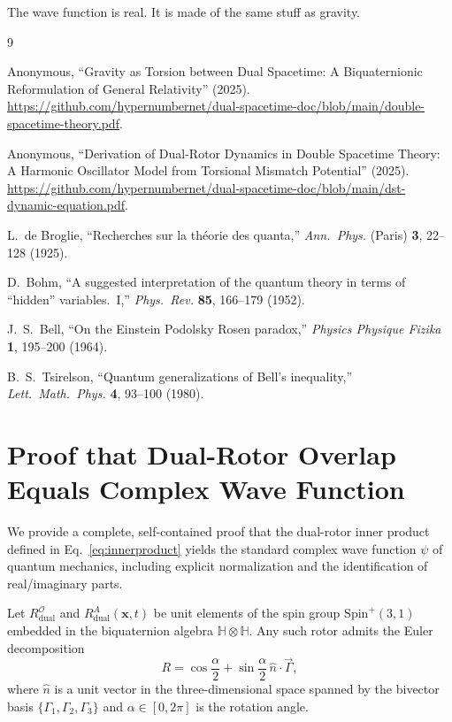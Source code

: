 \documentclass[dvipdfmx,a4paper]{article}
\begin{document}
The wave function is real. It is made of the same stuff as gravity.

\begin{thebibliography}{9}

Anonymous,
``Gravity as Torsion between Dual Spacetime: A Biquaternionic Reformulation of General Relativity'' (2025).
\url{https://github.com/hypernumbernet/dual-spacetime-doc/blob/main/double-spacetime-theory.pdf}.

Anonymous,
``Derivation of Dual-Rotor Dynamics in Double Spacetime Theory: A Harmonic Oscillator Model from Torsional Mismatch Potential'' (2025).
\url{https://github.com/hypernumbernet/dual-spacetime-doc/blob/main/dst-dynamic-equation.pdf}.

L.~de Broglie,
``Recherches sur la th\'eorie des quanta,''
\textit{Ann.\ Phys.} (Paris) \textbf{3}, 22--128 (1925).

D.~Bohm,
``A suggested interpretation of the quantum theory in terms of ``hidden'' variables.\ I,''
\textit{Phys.\ Rev.} \textbf{85}, 166--179 (1952).

J.~S.~Bell,
``On the Einstein Podolsky Rosen paradox,''
\textit{Physics Physique Fizika} \textbf{1}, 195--200 (1964).

B.~S.~Tsirelson,
``Quantum generalizations of Bell's inequality,''
\textit{Lett.\ Math.\ Phys.} \textbf{4}, 93--100 (1980).

\end{thebibliography}

\appendix
\section{Proof that Dual-Rotor Overlap Equals Complex Wave Function}

We provide a complete, self-contained proof that the dual-rotor inner product defined in Eq.~\eqref{eq:innerproduct} yields the standard complex wave function \(\psi\) of quantum mechanics, including explicit normalization and the identification of real/imaginary parts.

Let \( R_{\text{dual}}^{\mathcal{O}} \) and \( R_{\text{dual}}^{A}(\mathbf{x},t) \) be unit elements of the spin group \(\mathrm{Spin}^+(3,1)\) embedded in the biquaternion algebra \(\mathbb{H}\otimes\mathbb{H}\). Any such rotor admits the Euler decomposition
\[
R = \cos\frac{\alpha}{2} + \sin\frac{\alpha}{2}\, \hat{n}\cdot\vec{\Gamma},
\]
where \(\hat{n}\) is a unit vector in the three-dimensional space spanned by the bivector basis \(\{\Gamma_1,\Gamma_2,\Gamma_3\}\) and \(\alpha\in[0,2\pi]\) is the rotation angle.
\end{document}
